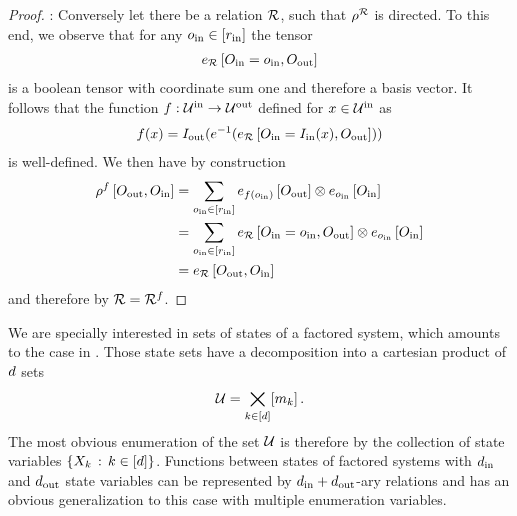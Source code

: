 \begin{proof}
    \proofleftsymbol:
    Conversely let there be a relation $\mathcal{R}$, such that $\rho^{\mathcal{R}}$ is directed.
    To this end, we observe that for any $o_{\mathrm{in}}\in[r_{\mathrm{in}}]$ the tensor
    \begin{align*}
        e_{\mathcal{R}}\left[O_{\mathrm{in}}=o_{\mathrm{in}},O_{\mathrm{out}}\right]
    \end{align*}
    is a boolean tensor with coordinate sum one and therefore a basis vector.
    It follows that the function $f : \mathcal{U}^{\mathrm{in}} \rightarrow \mathcal{U}^{\mathrm{out}} $ defined for $x\in\mathcal{U}^{\mathrm{in}}$ as
    \begin{align*}
        f(x)
        = I_{\mathrm{out}}(e^{-1}(e_{\mathcal{R}}\left[O_{\mathrm{in}}=I_{\mathrm{in}}(x),O_{\mathrm{out}}\right]))
    \end{align*}
    is well-defined.
    We then have by construction
    \begin{align*}
        \rho^{f}\left[O_{\mathrm{out}},O_{\mathrm{in}}\right]
        & = \sum_{o_{\mathrm{in}}\in[r_{\mathrm{in}}]}
        e_{f(o_{\mathrm{in}})}\left[O_{\mathrm{out}}\right] \otimes
        e_{o_{\mathrm{in}}}\left[O_{\mathrm{in}}\right] \\
        & =  \sum_{o_{\mathrm{in}}\in[r_{\mathrm{in}}]} e_{\mathcal{R}}\left[O_{\mathrm{in}}=o_{\mathrm{in}},O_{\mathrm{out}}\right] \otimes
        e_{o_{\mathrm{in}}}\left[O_{\mathrm{in}}\right] \\
        & = e_{\mathcal{R}}\left[O_{\mathrm{out}},O_{\mathrm{in}}\right]
    \end{align*}
    and therefore by  $\mathcal{R}=\mathcal{R}^{f}$.
\end{proof}

We are specially interested in sets of states of a factored system, which amounts to the case in .
Those state sets have a decomposition into a cartesian product of $d$ sets
\[ \mathcal{U} = \bigtimes_{k\in[d]}[m_{k}] \, . \]
The most obvious enumeration of the set $\mathcal{U}$ is therefore by the collection of state variables $\{X_{k}\, : \, k\in[d] \}$.
Functions between states of factored systems with $d_{\mathrm{in}}$ and $d_{\mathrm{out}}$ state variables can be represented by $d_{\mathrm{in}}+d_{\mathrm{out}}$-ary relations and  has an obvious generalization to this case with multiple enumeration variables.

